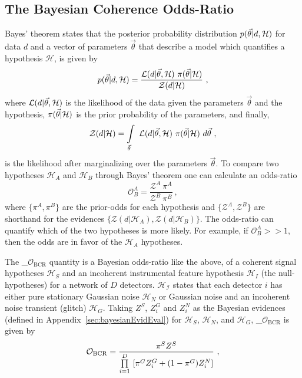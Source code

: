 \documentclass[%
 nofootinbib,
 amsmath,amssymb,
 aps,
 twocolumn,
 superscriptaddress
]{revtex4-2}
\newcommand{\mathcmd}[1]{{\sc \relax\ifmmode#1\else $#1$\fi}\xspace}
\newcommand{\bcrodds}{\mathcmd{\mathcal{O}_{\mathrm{BCR}}}}
\newcommand{\parameters}{\mathcmd{\vec{\theta}}}
\begin{document}
\subsection{The Bayesian Coherence Odds-Ratio}

Bayes' theorem states that the posterior probability distribution $p(\parameters|d,\mathcal{H})$ for data $d$ and a vector of parameters \parameters that describe a model which quantifies a hypothesis $\mathcal{H}$, is given by
\begin{equation}
p(\parameters|d,\mathcal{H}) = \frac{\mathcal{L}(d|\parameters, \mathcal{H}) \ \pi(\parameters | \mathcal{H})}{\mathcal{Z}(d|\mathcal{H})}\ , 
\end{equation}
where $\mathcal{L}(d|\parameters, \mathcal{H})$ is the likelihood of the data given the parameters \parameters and the hypothesis, $\pi(\parameters | \mathcal{H})$ is the prior probability of the parameters, and finally,
\begin{equation}
    \mathcal{Z}(d|\mathcal{H}) = \int\limits_{\parameters} \ \mathcal{L}(d|\parameters,\mathcal{H}) \ \pi(\parameters | \mathcal{H}) \ d\parameters\ ,
\end{equation} is the likelihood after marginalizing over the parameters \parameters.  To compare two hypotheses $\mathcal{H}_A$ and $\mathcal{H}_B$ through Bayes' theorem one can calculate an odds-ratio
\begin{equation}
    \mathcal{O}^A_B = \frac{\mathcal{Z}^A\ \pi^A}{\mathcal{Z}^B\ \pi^B}\ ,
\end{equation}
where  $\{\pi^A, \pi^B\}$ are the prior-odds for each hypothesis and $\{\mathcal{Z}^A, \mathcal{Z}^B\}$ are shorthand for the evidences $\{\mathcal{Z}(d|\mathcal{H}_A), \mathcal{Z}(d|\mathcal{H}_B)\}$. The odds-ratio can quantify which of the two hypotheses is more likely. For example, if $\mathcal{O}^A_B >> 1$, then the odds are in favor of the $\mathcal{H}_A$ hypotheses. 

The \bcrodds quantity is a Bayesian odds-ratio like the above, of a coherent signal hypotheses $\mathcal{H}_S$ and an incoherent instrumental feature hypothesis $\mathcal{H}_I$ (the null-hypotheses) for a network of $D$ detectors. $\mathcal{H_I}$ states that each detector $i$ has either pure stationary Gaussian noise $\mathcal{H}_N$ or Gaussian noise and an incoherent noise transient (glitch) $\mathcal{H}_G$. Taking $Z^S$, $Z^G_i$ and $Z^N_i$ as the Bayesian evidences (defined in Appendix~\ref{sec:bayesianEvidEval}) for $\mathcal{H}_S$, $\mathcal{H}_N$, and $\mathcal{H}_G$, \bcrodds is given by
\begin{equation}
\label{eq:bcr}
\bcrodds = \frac{\pi^S Z^S}{\prod\limits^D_{i=1} \ [\pi^G Z^G_i + (1-\pi^G)Z^N_i]}\ ,
\end{equation}
\end{document}
